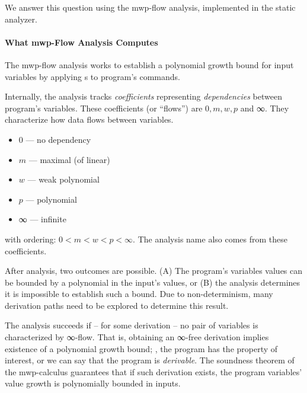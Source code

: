 We answer this question using the mwp-flow analysis,
implemented in the  static analyzer.

\paragraph*{What mwp-Flow Analysis Computes}

The mwp-flow analysis works to establish a polynomial growth
bound for input variables by applying s to program's
commands.

Internally, the analysis tracks \emph{coefficients}
representing \emph{dependencies} between program's variables. These coefficients
(or \enquote{flows}) are \(0, m, w,
p\) and ∞. They characterize
how data flows between variables.

\begin{itemize}
\item \(0\) --- no dependency
\item \(m\) --- maximal (of linear)
\item \(w\) --- weak polynomial
\item \(p\) --- polynomial
\item ∞ --- infinite
\end{itemize}

with ordering: \(0 < m < w < p < \infty\).
The analysis name also comes from these coefficients.

After analysis, two outcomes are possible. (A) The program's variables values
can be bounded by a polynomial in the input's values, or (B) the analysis
determines it is impossible to establish such a bound. Due to
non-determinism, many derivation paths need to be explored
to determine this result.

The analysis succeeds if -- for some derivation -- no pair of variables is
characterized by ∞-flow. That is, obtaining an ∞-free
derivation implies existence of a polynomial growth bound; \ie, the program has
the property of interest, or we can say that the program is
\emph{derivable}. The soundness theorem of the mwp-calculus
guarantees that if such derivation exists, the program variables' value growth
is polynomially bounded in inputs.

